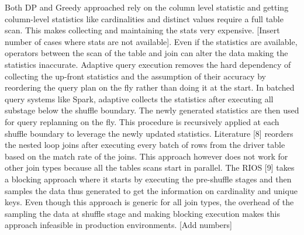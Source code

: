 Both DP and Greedy approached rely on the column level statistic and getting column-level statistics like cardinalities and distinct values require a full table scan. This makes collecting and maintaining the stats very expensive. [Insert number of cases where stats are not available]. Even if the statistics are available, operators between the scan of the table and join can alter the data making the statistics inaccurate. Adaptive query execution removes the hard dependency of collecting the up-front statistics and the assumption of their accuracy by reordering the query plan on the fly rather than doing it at the start. In batched query systems like Spark, adaptive collects the statistics after executing all substage below the shuffle boundary. The newly generated statistics are then used for query replanning on the fly. This procedure is recursively applied at each shuffle boundary to leverage the newly updated statistics. Literature [8] reorders the nested loop joins after executing every batch of rows from the driver table based on the match rate of the joins. This approach however does not work for other join types because all the tables scans start in parallel. The  RIOS [9] takes a blocking approach where it starts by executing the pre-shuffle stages and then samples the data thus generated to get the information on cardinality and unique keys. Even though this approach is generic for all join types, the overhead of the sampling the data at shuffle stage and making blocking execution makes this approach infeasible in production environments. [Add numbers]
